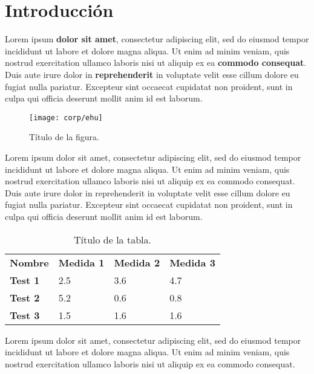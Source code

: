 \chapter{Introducción}

Lorem ipsum \textbf{dolor sit amet}, consectetur adipiscing elit, sed do eiusmod tempor incididunt ut labore et dolore magna aliqua. Ut enim ad minim veniam, quis nostrud exercitation ullamco laboris nisi ut aliquip ex ea \textbf{commodo consequat}. Duis aute irure dolor in \textbf{reprehenderit} in voluptate velit esse cillum dolore eu fugiat nulla pariatur. Excepteur sint occaecat cupidatat non proident, sunt in culpa qui officia deserunt mollit anim id est laborum.

\begin{figure}[!ht]
	\centering
	\texttt{[image: corp/ehu]}
	\caption{Título de la figura.}
	\label{fig:devops}
\end{figure}

Lorem ipsum dolor sit amet, consectetur adipiscing elit, sed do eiusmod tempor incididunt ut labore et dolore magna aliqua. Ut enim ad minim veniam, quis nostrud exercitation ullamco laboris nisi ut aliquip ex ea commodo consequat. Duis aute irure dolor in reprehenderit in voluptate velit esse cillum dolore eu fugiat nulla pariatur. Excepteur sint occaecat cupidatat non proident, sunt in culpa qui officia deserunt mollit anim id est laborum.

\begin{table}[h!]
	\centering
	\begin{tabular}{llll}
		\textbf{Nombre} & \textbf{Medida 1} & \textbf{Medida 2} & \textbf{Medida 3} \\
		\textbf{Test 1} & 2.5               & 3.6               & 4.7               \\
		\textbf{Test 2} & 5.2               & 0.6               & 0.8               \\
		\textbf{Test 3} & 1.5               & 1.6               & 1.6              
	\end{tabular}
	\caption{Título de la tabla.}
\end{table}

Lorem ipsum dolor sit amet, consectetur adipiscing elit, sed do eiusmod tempor incididunt ut labore et dolore magna aliqua. Ut enim ad minim veniam, quis nostrud exercitation ullamco laboris nisi ut aliquip ex ea commodo consequat.